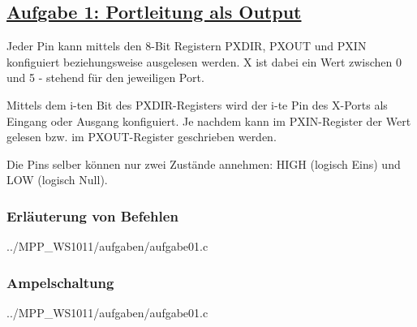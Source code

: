 \subsection*
{\href{http://cst.mi.fu-berlin.de/intern/19606-P-MPP/Aufgaben/040101.html}
{Aufgabe 1: Portleitung als Output}}

Jeder Pin kann mittels den 8-Bit Registern PXDIR, PXOUT und PXIN konfiguiert beziehungsweise ausgelesen werden.
X ist dabei ein Wert zwischen 0 und 5 - stehend für den jeweiligen Port.

Mittels dem i-ten Bit des PXDIR-Registers wird der i-te Pin des X-Ports als Eingang oder Ausgang konfiguiert.
Je nachdem kann im PXIN-Register der Wert gelesen bzw. im PXOUT-Register geschrieben werden.

Die Pins selber können nur zwei Zustände annehmen: HIGH (logisch Eins) und LOW (logisch Null).
\subsubsection*{Erläuterung von Befehlen}

{../MPP_WS1011/aufgaben/aufgabe01.c}

\subsubsection*{Ampelschaltung}


{../MPP_WS1011/aufgaben/aufgabe01.c}
